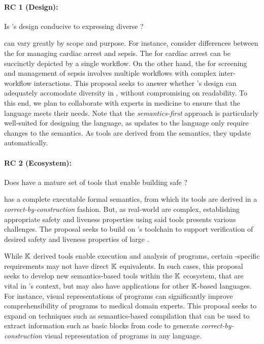 \paragraph{RC 1 (Design):} Is \MediK{}'s design conducive to expressing diverse \BPGs{}?

\BPGs{} can vary greatly by scope and purpose. For instance,
consider differences between the \BPGs{} for managing cardiac
arrest and sepsis. The \BPG{} for cardiac arrest can be
succinctly depicted by a single workflow. On the other hand, the \BPG{} for
screening and management of sepsis involves multiple workflows with complex
inter-workflow interactions.
This proposal seeks to answer whether \MediK{}'s
design can adequately accomodate diversity in \BPGs{}, without
compromising on readability. To this end, we plan to collaborate with
experts in medicine to ensure that the language meets their needs.
Note that the \emph{semantics-first} approach is particularly
well-suited for designing the language, as updates to the language
only require changes to the semantics. As tools are derived from the semantics,
they update automatically.

\paragraph{RC 2 (Ecosystem):} Does \MediK{} have a mature
set of tools that enable building safe \CDSSs{}?

\MediK{} has a complete executable formal semantics, from which
its tools are derived in a \emph{correct-by-construction} fashion.
But, as real-world \BPGs{} are complex, establishing appropriate safety and liveness properties using
said tools presents various challenges. The proposal seeks to build on
\MediK{}'s toolchain to support verification of desired safety and liveness
properties of large \BPGs{}.

While $\mathbb{K}$ derived tools enable execution and analysis of \MediK{} programs,
certain \BPG{}-specific requirements may not have direct $\mathbb{K}{}$ equivalents.
In such cases, this proposal seeks to develop new semantics-based tools within
the $\mathbb{K}{}$ ecosystem, that are vital in \MediK's context, but may also have
applications for other $\mathbb{K}$-based languages.
For instance, visual representations of \MediK{} programs can
significantly improve comprehensibility of \MediK{} programs to medical domain
experts. This proposal seeks to expand on techniques
such as semantics-based compilation that can be used to extract information such
as basic blocks from code to generate \emph{correct-by-construction} visual
representation of programs in any language.

